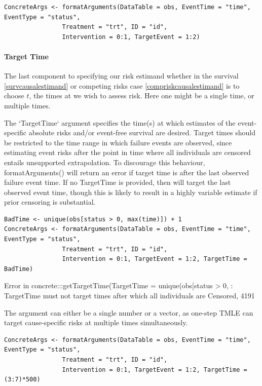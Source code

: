 \documentclass{report}
\newcommand{\1}{\ensuremath{\mathbf{1}}}
\begin{document}
\begin{lstlisting}
ConcreteArgs <- formatArguments(DataTable = obs, EventTime = "time", EventType = "status", 
				Treatment = "trt", ID = "id", 
				Intervention = 0:1, TargetEvent = 1:2)
\end{lstlisting}

\paragraph{Target Time}
\label{TargetTime}
The last component to specifying our risk estimand whether in the survival \eqref{survcausalestimand} or competing risks case \eqref{compriskcausalestimand} is to choose \(t\), the times at we wish to assess risk. Here one might be a single time, or multiple times.

The `TargetTime` argument specifies the time(s) at which estimates of the event-specific absolute risks and/or event-free survival are desired. Target times should be restricted to the time range in which failure events are observed, since estimating event risks after the point in time where all individuals are censored entails unsupported extrapolation. To discourage this behaviour, formatArguments() will return an error if target time is after the last observed failure event time. If no TargetTime is provided, then  will target the last observed event time, though this is likely to result in a highly variable estimate if prior censoring is substantial.

\begin{lstlisting}
BadTime <- unique(obs[status > 0, max(time)]) + 1
ConcreteArgs <- formatArguments(DataTable = obs, EventTime = "time", EventType = "status", 
				Treatment = "trt", ID = "id", 
				Intervention = 0:1, TargetEvent = 1:2, TargetTime = BadTime)
\end{lstlisting}

Error in concrete:::getTargetTime(TargetTime = unique(obs[status > 0,  : 
  TargetTime must not target times after which all individuals are Censored, 4191

The  argument can either be a single number or a vector, as one-step TMLE can target cause-specific risks at multiple times simultaneously.

\begin{lstlisting}
ConcreteArgs <- formatArguments(DataTable = obs, EventTime = "time", EventType = "status", 
				Treatment = "trt", ID = "id", 
				Intervention = 0:1, TargetEvent = 1:2, TargetTime = (3:7)*500)
\end{lstlisting}
\end{document}
